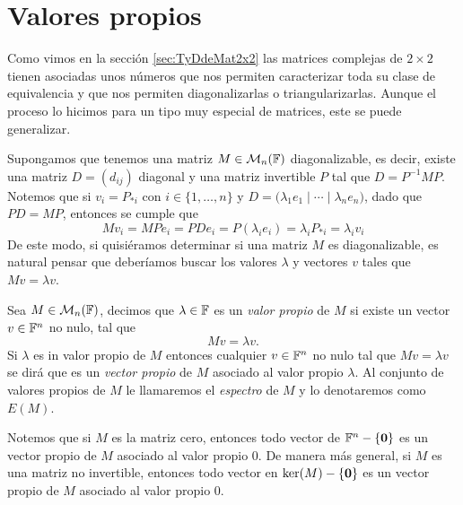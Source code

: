 \section{Valores propios}

Como vimos en la sección \ref{sec:TyDdeMat2x2} las matrices complejas de $2\times 2$ tienen asociadas unos números que nos permiten caracterizar toda su clase de equivalencia y que nos permiten diagonalizarlas o triangularizarlas. Aunque el proceso lo hicimos para un tipo muy especial de matrices, este se puede generalizar.

Supongamos que tenemos una matriz $M\in\mathcal{M}_n(\mathbb{F})$ diagonalizable, es decir, existe una matriz $D = (d_{ij})$ diagonal y una matriz invertible $P$ tal que $D =  P^{-1}MP$. Notemos que si $v_i = P_{*i}$ con $i \in \{1,\ldots,n\}$ y $D = \bigl( \lambda_1 e_1 \mid \cdots \mid \lambda_n e_n \bigr)$, dado que $PD = MP$, entonces se cumple que
  \[
    Mv_i = MPe_i = PD e_i = P(\lambda_i e_i) = \lambda_i P_{*i} = \lambda_i v_i
  \]
De este modo, si quisiéramos determinar si una matriz $M$ es diagonalizable, es natural pensar que deberíamos buscar los valores $\lambda$ y vectores $v$ tales que $Mv = \lambda v$.

\begin{defi}
  Sea $M \in \mathcal{M}_n(\mathbb{F})$, decimos que $\lambda \in \mathbb{F}$ es un \emph{valor propio} de $M$ si existe un vector $v \in \mathbb{F}^n$ no nulo, tal que
    \[Mv = \lambda v.\]
  Si $\lambda$ es in valor propio de $M$ entonces cualquier $v \in \mathbb{F}^n$ no nulo tal que $Mv = \lambda v$ se dirá que es un \emph{vector propio} de $M$ asociado al valor propio $\lambda$. Al conjunto de valores propios de $M$ le llamaremos el \emph{espectro} de $M$ y lo denotaremos como $E(M)$.
\end{defi}

Notemos que si $M$ es la matriz cero, entonces todo vector de $\mathbb{F}^n - \{\mathbf{0}\}$ es un vector propio de $M$ asociado al valor propio $0$. De manera más general, si $M$ es una matriz no invertible, entonces todo vector en $\ker(M)-\{\mathbf{0}\}$ es un vector propio de $M$ asociado al valor propio $0$.

